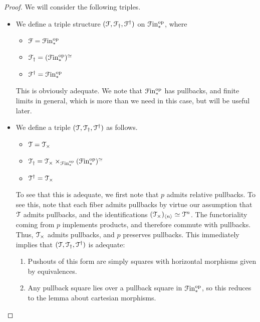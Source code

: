\documentclass[main.tex]{subfiles}
\begin{document}
\begin{proof}
  We will consider the following triples.

  \begin{itemize}
    \item We define a triple structure $(\mathcal{F}, \mathcal{F}_{\dagger}, \mathcal{F}^{\dagger})$ on $\mathcal{F}\mathrm{in}_{*}^{\mathrm{op}}$, where
      \begin{itemize}
        \item $\mathcal{F} = \mathcal{F}\mathrm{in}_{*}^{\mathrm{op}}$

        \item $\mathcal{F}_{\dagger} = (\mathcal{F}\mathrm{in}_{*}^{\mathrm{op}})^{\simeq}$

        \item $\mathcal{F}^{\dagger} = \mathcal{F}\mathrm{in}_{*}^{\mathrm{op}}$
      \end{itemize}

      This is obviously adequate. We note that $\mathcal{F}\mathrm{in}_{*}^{\mathrm{op}}$ has pullbacks, and finite limits in general, which is more than we need in this case, but will be useful later.

    \item We define a triple $(\mathcal{T}, \mathcal{T}_{\dagger}, \mathcal{T}^{\dagger})$ as follows.
      \begin{itemize}
        \item $\mathcal{T} = \mathcal{T}_{\times}$

        \item $\mathcal{T}_{\dagger} = \mathcal{T}_{\times} \times_{\mathcal{F}\mathrm{in}_{*}^{\mathrm{op}}}(\mathcal{F}\mathrm{in}_{*}^{\mathrm{op}})^{\simeq}$

        \item $\mathcal{T}^{\dagger} = \mathcal{T}_{\times}$
      \end{itemize}

      To see that this is adequate, we first note that $p$ admits relative pullbacks. To see this, note that each fiber admits pullbacks by virtue our assumption that $\mathcal{T}$ admits pullbacks, and the identifications $( \mathcal{T}_{\times} )_{\langle n \rangle} \simeq \mathcal{T}^{n}$. The functoriality coming from $p$ implements products, and therefore commute with pullbacks. Thus, $\mathcal{T}_{\times}$ admits pullbacks, and $p$ preserves pullbacks. This immediately implies that $(\mathcal{T}, \mathcal{T}_{\dagger}, \mathcal{T}^{\dagger})$ is adequate:
      \begin{enumerate}
        \item Pushouts of this form are simply squares with horizontal morphisms given by equivalences.

        \item Any pullback square lies over a pullback square in $\mathcal{F}\mathrm{in}_{*}^{\mathrm{op}}$, so this reduces to the lemma about cartesian morphisms.
      \end{enumerate}


\end{itemize}
\end{proof}
\end{document}

